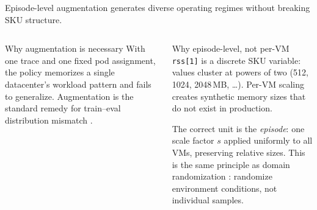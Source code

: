\documentclass[11pt,aspectratio=43]{beamer}
\begin{document}
\begin{frame}{Episode-level augmentation generates diverse operating regimes without breaking SKU structure.}

  \begin{columns}[T,onlytextwidth]
      \begin{block}{Why augmentation is necessary}
        With one trace and one fixed pod assignment, the policy memorizes a single
        datacenter's workload pattern and fails to generalize.
        Augmentation is the standard remedy for train--eval distribution mismatch
        \cite{tobin2017domain,laskin2020rad}.
      \end{block}

      \begin{block}{Why episode-level, not per-VM}
        \texttt{rss[1]} is a discrete SKU variable: values cluster at powers of two
        (512, 1024, 2048\,MB, \ldots).
        Per-VM scaling creates synthetic memory sizes that do not exist in production.

        \vspace{0.3em}
        The correct unit is the \emph{episode}: one scale factor $s$ applied uniformly
        to all VMs, preserving relative sizes.
        This is the same principle as domain randomization \cite{tobin2017domain}:
        randomize environment conditions, not individual samples.
      \end{block}
  \end{columns}

\end{frame}

\end{document}
